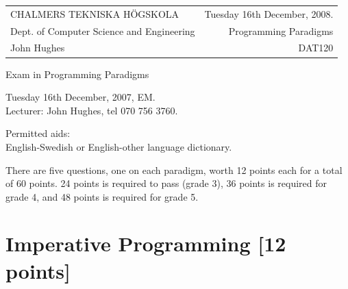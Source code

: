 \documentclass{article}
\begin{document}
\noindent
\begin{tabular}{lr}
CHALMERS TEKNISKA H\"OGSKOLA &Tuesday 16th December, 2008.\\
Dept. of Computer Science and Engineering & Programming Paradigms\\
John Hughes                  & DAT120 \\
\end{tabular}

\vspace{2.5cm} \noindent
\begin{center} {\LARGE
Exam in Programming Paradigms}
\end{center}

\vspace{1.5cm}

\noindent
Tuesday 16th December, 2007, EM.\\
Lecturer: John Hughes, tel 070 756 3760.
\vspace{1cm}

\noindent
Permitted aids:\\
English-Swedish or English-other language dictionary.

There are five questions, one on each paradigm, worth 12 points each
for a total of 60 points. 24 points is required to pass (grade 3), 36
points is required for grade 4, and 48 points is required for grade 5.

\newcommand{\comment}[1]{\marginpar{#1}}

\newpage

\section{Imperative Programming [12 points]}
\end{document}
